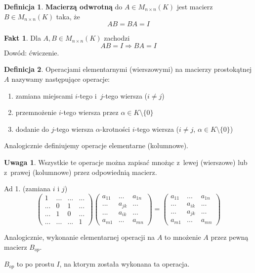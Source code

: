\documentclass[12pt,a4paper]{article}
\theoremstyle{plain}
\theoremstyle{definition}
\newtheorem{ft}{Fakt}[section]
\theoremstyle{definition}
\newtheorem{df}{Definicja}[section]
\theoremstyle{definition}
\theoremstyle{definition}
\theoremstyle{definition}
\theoremstyle{definition}
\theoremstyle{definition}
\theoremstyle{definition}
\newtheorem*{uw}{Uwaga}
\theoremstyle{definition}
\begin{document}
\begin{df}
    \textbf{Macierzą odwrotną} do $A \in M_{n\times n}(K)$ jest macierz
  $B \in M_{n\times n}(K)$ taka, że
  \[AB = BA = I\]
\end{df}

\begin{ft}
    Dla $A,B \in M_{n\times n}(K)$ zachodzi
    \[AB=I \Rightarrow BA=I\]
    Dowód: ćwiczenie.
\end{ft}

\begin{df}
    Operacjami elementarnymi (wierszowymi) na macierzy prostokątnej $A$
    nazywamy następujące operacje:
    \begin{enumerate}[{(}1{)}]
        \item zamiana miejscami $i$-tego i~$j$-tego wiersza ($i \neq j$)
        \item przemnożenie $i$-tego wiersza przez $\alpha \in K \setminus \{0\}$
        \item dodanie do $j$-tego wiersza $\alpha$-krotności $i$-tego wiersza
          ($i \neq j$, $\alpha \in K \setminus \{0\}$)
    \end{enumerate}
    Analogicznie definiujemy operacje elementarne (kolumnowe).
\end{df}

\begin{uw}
    Wszystkie te operacje można zapisać mnożąc z~lewej (wierszowe) lub
  z~prawej (kolumnowe) przez odpowiednią macierz.

  Ad 1. (zamiana $i$ i $j$)
  \[\begin{pmatrix}
     1 &...&...&...\\
    ...& 0 & 1 &...\\
    ...& 1 & 0 &...\\
    ...&...&...& 1
  \end{pmatrix}\begin{pmatrix}
    a_{11}&...&a_{1n}\\
    ...&a_{jk}&...\\
    ...&a_{ik}&...\\
    a_{m1}&...&a_{mn}
  \end{pmatrix}=\begin{pmatrix}
    a_{11}&...&a_{1n}\\
    ...&a_{ik}&...\\
    ...&a_{jk}&...\\
    a_{m1}&...&a_{mn}
  \end{pmatrix}\]

  Analogicznie, wykonanie elementarnej operacji na $A$ to
  mnożenie $A$ przez pewną macierz $B_{op}$.
  
  $B_{op}$ to po prostu $I$, na ktorym została wykonana ta operacja.
\end{uw}
\end{document}
